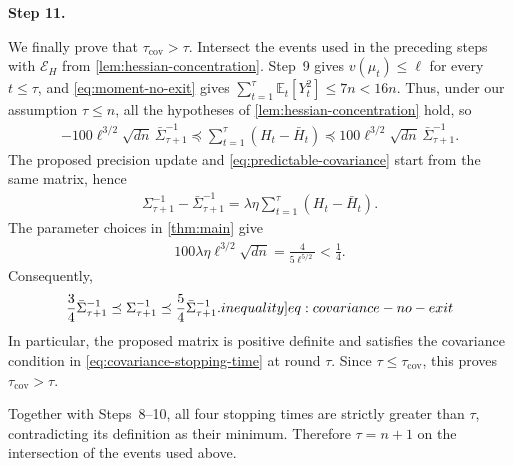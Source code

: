\documentclass[12pt,cleveref]{jmlr}
\newcommand{\ineqlabel}[1]{\label[inequality]{#1}}
\newcommand{\proofstepinline}[1]{%
    \par\addvspace{0.6\baselineskip}
    \noindent
    {\normalfont\normalsize\bfseries\color{blue!55!black}Step #1.}\enspace\ignorespaces
}
\newcommand{\E}{\mathbb E}
\newcommand{\1}{\mathbf 1}
\begin{document}
\proofstepinline{11}
We finally prove that $\tau_{\mathrm{cov}}>\tau$.
Intersect the events used in the preceding steps with
$\mathcal E_H$ from \cref{lem:hessian-concentration}.
Step~9 gives $v(\mu_t)\leq\ell$ for every $t\leq\tau$, and
\cref{eq:moment-no-exit} gives
$\sum_{t=1}^{\tau}\E_t[Y_t^2]\leq7n<16n$.
Thus, under our assumption $\tau\leq n$, all the hypotheses of
\cref{lem:hessian-concentration} hold, so
\begin{align}
    -100\ell^{3/2}\sqrt{dn}\,\bar\Sigma_{\tau+1}^{-1}
    \preceq\sum_{t=1}^{\tau}(H_t-\bar H_t)
    \preceq100\ell^{3/2}\sqrt{dn}\,\bar\Sigma_{\tau+1}^{-1}.
\end{align}
The proposed precision update and \cref{eq:predictable-covariance}
start from the same matrix, hence
\begin{align}
    \Sigma_{\tau+1}^{-1}-\bar\Sigma_{\tau+1}^{-1}
    =\lambda\eta\sum_{t=1}^{\tau}(H_t-\bar H_t).
\end{align}
The parameter choices in \cref{thm:main} give
\begin{align}
    100\lambda\eta\ell^{3/2}\sqrt{dn}
    =\frac{4}{5\ell^{5/2}}<\frac14.
\end{align}
Consequently,
\begin{align}
    \frac34\bar\Sigma_{\tau+1}^{-1}
    \preceq\Sigma_{\tau+1}^{-1}
    \preceq\frac54\bar\Sigma_{\tau+1}^{-1}.
    \ineqlabel{eq:covariance-no-exit}
\end{align}
In particular, the proposed matrix is positive definite and satisfies
the covariance condition in \cref{eq:covariance-stopping-time} at
round $\tau$. Since $\tau\leq\tau_{\mathrm{cov}}$, this proves
$\tau_{\mathrm{cov}}>\tau$.

Together with Steps~8--10, all four stopping times are strictly greater
than $\tau$, contradicting its definition as their minimum.
Therefore $\tau=n+1$ on the intersection of the events used above.
\end{document}
